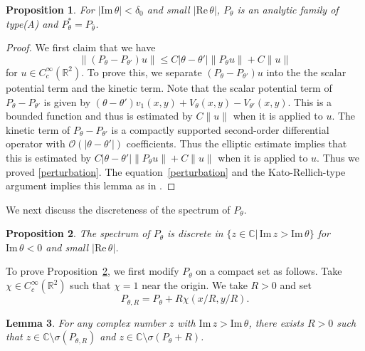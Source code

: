 \documentclass{article}
\theoremstyle{plain}
\newtheorem{prop}{Proposition}[section]
\newtheorem{lemma}[prop]{Lemma}
\theoremstyle{definition}
\theoremstyle{remark}
\newcommand{\RR}{\mathbb{R}}
\newcommand{\CC}{\mathbb{C}}
\newcommand{\Cinf}{C^{\infty}}
\newcommand{\RE}{\mathrm{Re}\,}
\newcommand{\IM}{\mathrm{Im}\,}
\begin{document}
\begin{prop}\label{prop2-1}
For $|\IM \theta|<\delta_0$ and small $|\RE \theta|$, $P_{\theta}$ is an analytic family of type(A) and 
$P_{\theta}^*=P_{\bar{\theta}}$.
\end{prop}
\begin{proof}
We first claim that we have 
\begin{equation}\label{perturbation}
\|(P_{\theta}-P_{\theta'})u\|\le C|\theta-\theta'|\|P_{\theta}u\|+C\|u\| 
\end{equation}
for $u\in \Cinf_c(\RR^2)$. 
To prove this, we separate $(P_{\theta}-P_{\theta'})u$ into the the scalar potential term and 
the kinetic term. 
Note that the scalar potential term of $P_{\theta}-P_{\theta'}$ is given by
$(\theta-\theta')v_1(x,y)+V_{\theta}(x, y)-V_{\theta'}(x, y)$. 
This is a bounded function and thus is estimated by $C\|u\|$ when it is applied to $u$. 
The kinetic term of $P_{\theta}-P_{\theta'}$ is a compactly supported second-order differential operator with $\mathcal{O}(|\theta-\theta'|)$ 
coefficients. Thus the elliptic estimate implies that this is estimated by $C|\theta-\theta'|\|P_{\theta}u\|+C\|u\|$ 
when it is applied to $u$. Thus we proved \eqref{perturbation}. 
The equation~\eqref{perturbation} and the Kato-Rellich-type argument implies this lemma 
as in \cite{K1}. 
\end{proof}
















We next discuss the discreteness of the spectrum of $P_{\theta}$. 
\begin{prop}\label{prop2-2}
The spectrum of $P_{\theta}$ is discrete in $\{z\in \CC|\, \IM z>\IM \theta\}$ 
for $\IM \theta<0$ and small $|\RE \theta|$. 
\end{prop}

To prove Proposition~\ref{prop2-2}, we first modify $P_{\theta}$ on a compact set as follows.
Take $\chi\in \Cinf_c(\RR^2)$ such that $\chi=1$ near the origin.  
We take $R>0$ and set 
\[
P_{\theta, R}=P_{\theta}+R\chi(x/R, y/R).
\]


\begin{lemma}\label{lem-inv}
For any complex number $z$ with $\IM z>\IM \theta$, there exists $R>0$ such that 
$z \in \CC\setminus \sigma(P_{\theta, R})$ and $z \in \CC\setminus \sigma(P_{\theta}+R)$.
\end{lemma}
\end{document}
